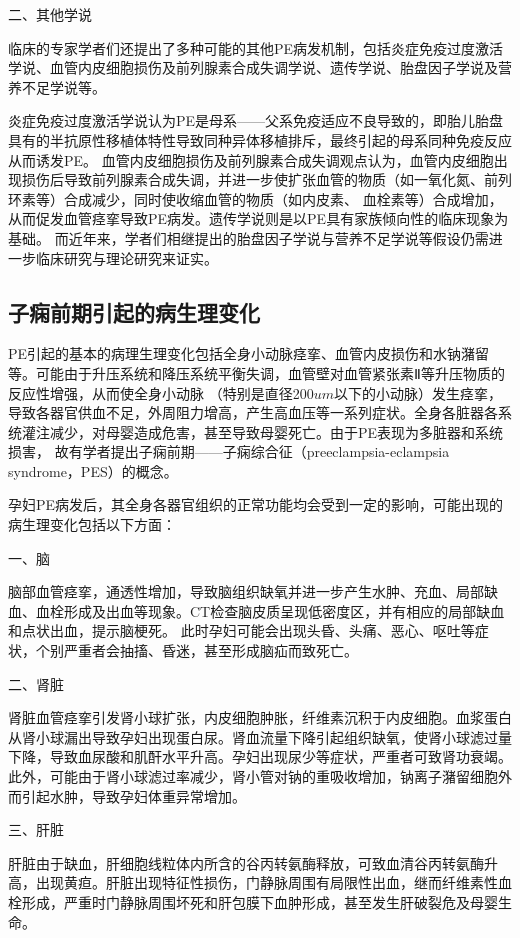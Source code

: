 二、其他学说

临床的专家学者们还提出了多种可能的其他PE病发机制，包括炎症免疫过度激活学说、血管内皮细胞损伤及前列腺素合成失调学说、遗传学说、胎盘因子学说及营养不足学说等。

炎症免疫过度激活学说认为PE是母系——父系免疫适应不良导致的，即胎儿胎盘具有的半抗原性移植体特性导致同种异体移植排斥，最终引起的母系同种免疫反应从而诱发PE\cite{Sibai2005,OAG9,Shi2006,Moffett2002}。
血管内皮细胞损伤及前列腺素合成失调观点认为，血管内皮细胞出现损伤后导致前列腺素合成失调，并进一步使扩张血管的物质（如一氧化氮、前列环素等）合成减少，同时使收缩血管的物质（如内皮素、
血栓素等）合成增加，从而促发血管痉挛导致PE病发\cite{OAG9,Sibai2005}。遗传学说则是以PE具有家族倾向性的临床现象为基础\cite{OAG9,Sibai2005,Ge2013}。
而近年来，学者们相继提出的胎盘因子学说\cite{Shi2006}与营养不足学说\cite{OAG9}等假设仍需进一步临床研究与理论研究来证实。

\subsection{子痫前期引起的病生理变化}
PE引起的基本的病理生理变化包括全身小动脉痉挛、血管内皮损伤和水钠潴留等\cite{OAG9}。可能由于升压系统和降压系统平衡失调，血管壁对血管紧张素Ⅱ等升压物质的反应性增强，从而使全身小动脉
（特别是直径200$um$以下的小动脉）发生痉挛，导致各器官供血不足，外周阻力增高，产生高血压等一系列症状。全身各脏器各系统灌注减少，对母婴造成危害，甚至导致母婴死亡。由于PE表现为多脏器和系统损害，
故有学者提出子痫前期——子痫综合征（preeclampsia-eclampsia syndrome，PES）的概念\cite{OAG9}。

孕妇PE病发后，其全身各器官组织的正常功能均会受到一定的影响，可能出现的病生理变化包括以下方面\cite{OAG9}：

一、脑

脑部血管痉挛，通透性增加，导致脑组织缺氧并进一步产生水肿、充血、局部缺血、血栓形成及出血等现象。CT检查脑皮质呈现低密度区，并有相应的局部缺血和点状出血，提示脑梗死。
此时孕妇可能会出现头昏、头痛、恶心、呕吐等症状，个别严重者会抽搐、昏迷，甚至形成脑疝而致死亡。

二、肾脏

肾脏血管痉挛引发肾小球扩张，内皮细胞肿胀，纤维素沉积于内皮细胞。血浆蛋白从肾小球漏出导致孕妇出现蛋白尿。肾血流量下降引起组织缺氧，使肾小球滤过量下降，导致血尿酸和肌酐水平升高。孕妇出现尿少等症状，严重者可致肾功衰竭。
此外，可能由于肾小球滤过率减少，肾小管对钠的重吸收增加，钠离子潴留细胞外而引起水肿，导致孕妇体重异常增加。

三、肝脏

肝脏由于缺血，肝细胞线粒体内所含的谷丙转氨酶释放，可致血清谷丙转氨酶升高，出现黄疸。肝脏出现特征性损伤，门静脉周围有局限性出血，继而纤维素性血栓形成，严重时门静脉周围坏死和肝包膜下血肿形成，甚至发生肝破裂危及母婴生命。

